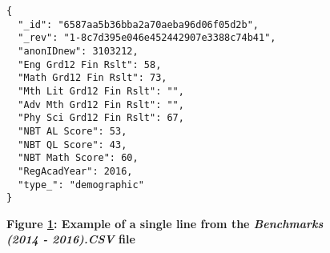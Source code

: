 \begin{figure}[H]
  \centering
  \begin{mdframed}
    \centering
    \begin{verbatim}
{
  "_id": "6587aa5b36bba2a70aeba96d06f05d2b",
  "_rev": "1-8c7d395e046e452442907e3388c74b41",
  "anonIDnew": 3103212,
  "Eng Grd12 Fin Rslt": 58,
  "Math Grd12 Fin Rslt": 73,
  "Mth Lit Grd12 Fin Rslt": "",
  "Adv Mth Grd12 Fin Rslt": "",
  "Phy Sci Grd12 Fin Rslt": 67,
  "NBT AL Score": 53,
  "NBT QL Score": 43,
  "NBT Math Score": 60,
  "RegAcadYear": 2016,
  "type_": "demographic"
}         
        \end{verbatim}
  \end{mdframed}
  \caption[Event Document JSON Sample]{\textbf{Figure \ref{fig-json-admission}: Example of a single line from the \textit{Benchmarks (2014 - 2016).CSV} file}}
  \label{fig-json-admission}
\end{figure}